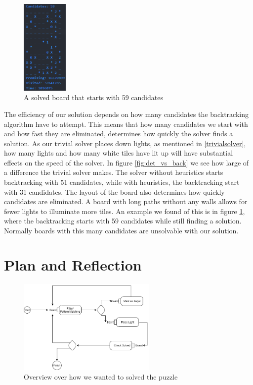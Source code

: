 \documentclass[12pt]{article}
\begin{document}
\label{plan and ref}
\begin{figure}
\begin{center}
    \centering
    \includegraphics[width=0.2\textwidth]{doc/59Candidates.png}
    \caption{A solved board that starts with 59 candidates}
    \label{fig:9x13Solved}
\end{center}
\end{figure}

The efficiency of our solution depends on how many candidates the backtracking algorithm have to attempt. This means that how many candidates we start with and how fast they are eliminated, determines how quickly the solver finds a solution. As our trivial solver places down lights, as mentioned in \ref{trivialsolver}, how many lights and how many white tiles have lit up will have substantial effects on the speed of the solver. In figure \ref{fig:det_vs_back} we see how large of a difference the trivial solver makes. The solver without heuristics starts backtracking with 51 candidates, while with heuristics, the backtracking start with 31 candidates. The layout of the board also determines how quickly candidates are eliminated. A board with long paths without any walls allows for fewer lights to illuminate more tiles. An example we found of this is in figure \ref{fig:9x13Solved}, where the backtracking starts with 59 candidates while still finding a solution. Normally boards with this many candidates are unsolvable with our solution. 

\newpage
\section{Plan and Reflection}
\label{plan and ref}
\begin{figure}
    \begin{center}
        \centering
        \includegraphics[width=0.6\textwidth]{doc/architecture.uml.drawio.png}
        \caption{Overview over how we wanted to solved the puzzle}
        \label{fig:architecture}
    \end{center}
\end{figure}
\end{document}

